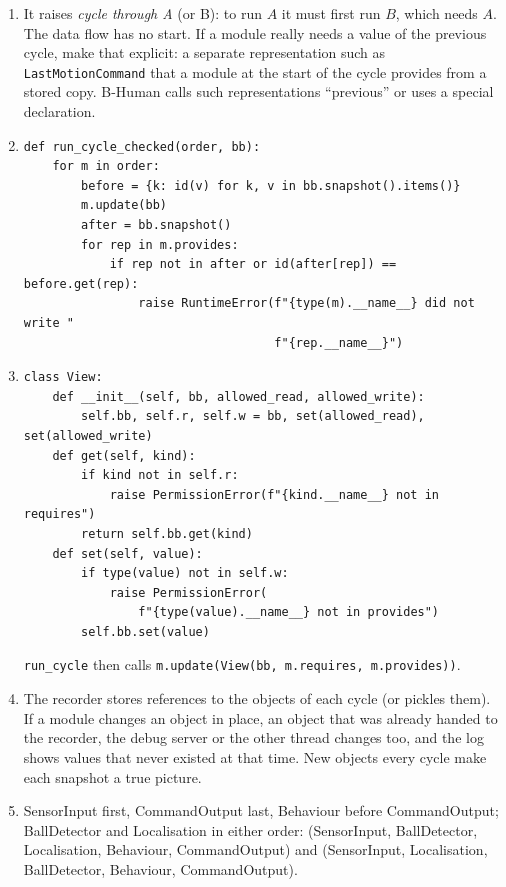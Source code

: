 \begin{enumerate}[label=\textbf{\ansnum.\arabic*}]
  \item It raises \emph{cycle through A} (or B): to run $A$ it must first run $B$, which needs $A$. The data flow has no start. If a module really needs a value of the previous cycle, make that explicit: a separate representation such as \texttt{LastMotionCommand} that a module at the start of the cycle provides from a stored copy. B-Human calls such representations ``previous'' or uses a special declaration.
  \item
\begin{verbatim}
def run_cycle_checked(order, bb):
    for m in order:
        before = {k: id(v) for k, v in bb.snapshot().items()}
        m.update(bb)
        after = bb.snapshot()
        for rep in m.provides:
            if rep not in after or id(after[rep]) == before.get(rep):
                raise RuntimeError(f"{type(m).__name__} did not write "
                                   f"{rep.__name__}")
\end{verbatim}
  \item
\begin{verbatim}
class View:
    def __init__(self, bb, allowed_read, allowed_write):
        self.bb, self.r, self.w = bb, set(allowed_read), set(allowed_write)
    def get(self, kind):
        if kind not in self.r:
            raise PermissionError(f"{kind.__name__} not in requires")
        return self.bb.get(kind)
    def set(self, value):
        if type(value) not in self.w:
            raise PermissionError(
                f"{type(value).__name__} not in provides")
        self.bb.set(value)
\end{verbatim}
\verb!run_cycle! then calls \verb!m.update(View(bb, m.requires, m.provides))!.
  \item The recorder stores references to the objects of each cycle (or pickles them). If a module changes an object in place, an object that was already handed to the recorder, the debug server or the other thread changes too, and the log shows values that never existed at that time. New objects every cycle make each snapshot a true picture.
  \item SensorInput first, CommandOutput last, Behaviour before CommandOutput; BallDetector and Localisation in either order: (SensorInput, BallDetector, Localisation, Behaviour, CommandOutput) and (SensorInput, Localisation, BallDetector, Behaviour, CommandOutput).
\end{enumerate}
